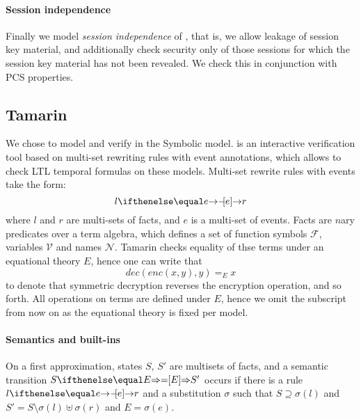 \paragraph{Session independence}
Finally we model \emph{session independence} of \mEdhoc, that is, we allow
leakage of session key material, and additionally check security only of those
sessions for which the session key material has not been revealed. We check this
in conjunction with PCS properties.


\subsection{Tamarin}
We chose \mTamarin to model and verify \mEdhoc in the Symbolic model.
%
\mTamarin is an interactive verification tool based on multi-set rewriting rules
with event annotations, which allows to check LTL temporal formulas on these
models.
%
Multi-set rewrite rules with events take the form:
%
\[ l \ifarrow[e] r \]
%
where $l$ and $r$ are multi-sets of facts, and $e$ is a multi-set of events.
%
Facts are $n$ary predicates over a term algebra, which defines a set of function
symbols $\mathcal F$, variables $\mathcal V$ and names $\mathcal N$. Tamarin
checks equality of thse terms under an equational theory $E$, hence one can
write that
%
\[ dec(enc(x,y),y) =_E x \]
%
to denote that symmetric decryption reverses the encryption operation, and so
forth. All operations on terms are defined under $E$, hence we omit the
subscript from now on as the equational theory is fixed per model.

\paragraph{Semantics and built-ins} On a first approximation, \mTamarin states
$S$, $S'$ are multisets of facts, and a semantic transition $S \semarrow[E] S'$
occurs if there is a rule $l \ifarrow[e] r$ and a substitution $\sigma$ such
that $S \supseteq \sigma(l)$ and $S' = S \setminus \sigma(l) \uplus \sigma(r)$
and $E = \sigma(e)$.

